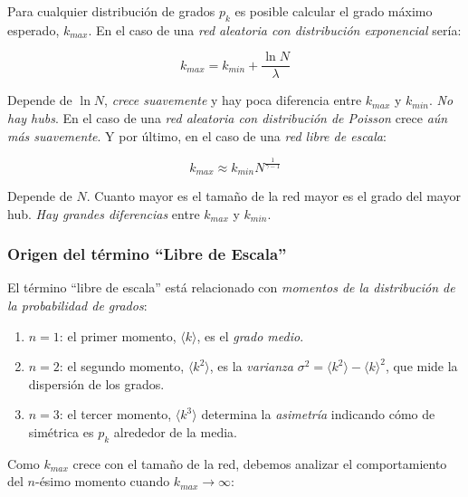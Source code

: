 \documentclass[10pt,spanish, landscape, twocolumn]{article}
\begin{document}
Para cualquier distribución de grados $p_k$ es posible calcular el grado máximo esperado, $k_{max}$. En el caso de una \textit{\textcolor{temacinco}{red aleatoria con distribución exponencial}} sería:

\begin{displaymath}
    k_{max} = k_{min} + \frac{\ln N}{\lambda}
\end{displaymath}

Depende de $\ln N$, \textit{\textcolor{temacinco}{crece suavemente}} y hay poca diferencia entre $k_{max}$ y $k_{min}$. \textit{\textcolor{temacinco}{No hay hubs}}. En el caso de una \textit{\textcolor{temacinco}{red aleatoria con distribución de Poisson}} crece \textit{\textcolor{temacinco}{aún más suavemente}}. Y por último, en el caso de una \textit{\textcolor{temacinco}{red libre de escala}}:

\begin{displaymath}
    k_{max} \approx k_{min} N^{\frac{1}{\gamma - 1}}
\end{displaymath}

Depende de $N$. Cuanto mayor es el tamaño de la red mayor es el grado del mayor hub. \textit{\textcolor{temacinco}{Hay grandes diferencias}} entre $k_{max}$ y $k_{min}$.

\subsubsection{\textcolor{temacinco}Origen del término ``Libre de Escala''}
El término ``libre de escala'' está relacionado con \textit{\textcolor{temacinco}{momentos de la distribución de la probabilidad de grados}}:

\begin{enumerate}[\color{temacinco}{$\heartsuit$}]
    \item $n = 1$: el primer momento, $\langle k \rangle$, es el \textit{\textcolor{temacinco}{grado medio}}.
    \item $n = 2$: el segundo momento, $\langle k^2 \rangle$, es la \textit{\textcolor{temacinco}{varianza}} $\sigma^2 = \langle k^2 \rangle - \langle k \rangle^2$, que mide la dispersión de los grados.
    \item $n = 3$: el tercer momento, $\langle k^3 \rangle$ determina la \textit{\textcolor{temacinco}{asimetría}} indicando cómo de simétrica es $p_k$ alrededor de la media.
\end{enumerate}

Como $k_{max}$ crece con el tamaño de la red, debemos analizar el comportamiento del $n$-ésimo momento cuando $k_{max} \rightarrow \infty$:
\end{document}
